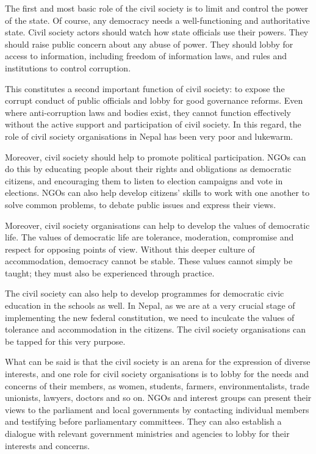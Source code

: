 \documentclass[
]{book}
\begin{document}
\begin{questions}
The first and most basic role of the civil society is to limit and control the power of the state. Of course, any democracy needs a well-functioning and authoritative state. Civil society actors should watch how state officials use their powers. They should raise public concern about any abuse of power. They should lobby for access to information, including freedom of information laws, and rules and institutions to control corruption.            

This constitutes a second important function of civil society:  to expose the corrupt conduct of public officials and lobby for good governance reforms. Even where anti-corruption laws and bodies exist, they cannot function effectively without the active support and participation of civil society. In this regard, the role of civil society organisations in Nepal has been very poor and lukewarm.

Moreover, civil society should help to promote political participation. NGOs can do this by educating people about their rights and obligations as democratic citizens, and encouraging them to listen to election campaigns and vote in elections. NGOs can also help develop citizens' skills to work with one another to solve common problems, to debate public issues and express their views.

Moreover,  civil society organisations can help to develop the  values of democratic life. The values of democratic life are tolerance, moderation, compromise and respect for opposing points of view. Without this deeper culture of accommodation, democracy cannot be stable. These values cannot simply be taught; they must also be experienced through practice.

The civil society can also help to develop programmes for democratic civic education in the schools as well. In Nepal, as we are at a very crucial stage of implementing the new  federal constitution, we need to inculcate the values of tolerance and accommodation in the citizens. The civil society organisations can be tapped for this very purpose.

What can be said is that the  civil society is an arena for the expression of diverse interests, and one role for civil society organisations is to lobby for the needs and concerns of their members, as women, students, farmers, environmentalists, trade unionists, lawyers, doctors and so on. NGOs and interest groups can present their views to the parliament and local governments by contacting individual members and testifying before parliamentary committees. They can also establish a dialogue with relevant government ministries and agencies to lobby for their interests and concerns.


\end{questions}
\end{document}
